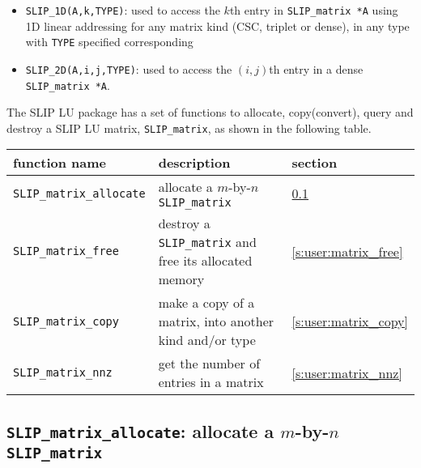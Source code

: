 \documentclass[12pt]{article}
\theoremstyle{definition}
\begin{document}
\begin{itemize}

\item
\verb|SLIP_1D(A,k,TYPE)|: used to access the $k$th entry in
                         \verb|SLIP_matrix *A| using 1D linear addressing for
                         any matrix kind (CSC, triplet or dense), in any type
                         with \verb|TYPE| specified corresponding

\item
\verb|SLIP_2D(A,i,j,TYPE)|: used to access the $(i,j)$th entry in a dense
                            \verb|SLIP_matrix *A|.

\end{itemize}

The SLIP LU package has a set of functions to allocate, copy(convert), query and
destroy a SLIP LU matrix, \verb|SLIP_matrix|, as shown in the following table.

{\small
\begin{center}
\begin{tabular}{lp{2.5in}l}
\hline
function name & description & section \\
\hline
\verb|SLIP_matrix_allocate|
    & allocate a $m$-by-$n$ \verb|SLIP_matrix|
    & \ref{s:user:matrix_allocate} \\
\hline
\verb|SLIP_matrix_free|
    & destroy a \verb|SLIP_matrix| and free its allocated memory
    & \ref{s:user:matrix_free} \\
\hline
\verb|SLIP_matrix_copy|
    & make a copy of a matrix, into another kind and/or type
    & \ref{s:user:matrix_copy} \\
\hline
\verb|SLIP_matrix_nnz|
    & get the number of entries in a matrix
    & \ref{s:user:matrix_nnz} \\
\hline
\end{tabular}
\end{center}
}

\newpage
\cprotect\subsection{\verb|SLIP_matrix_allocate|: allocate a $m$-by-$n$
\verb|SLIP_matrix|}
\label{s:user:matrix_allocate}
\end{document}
